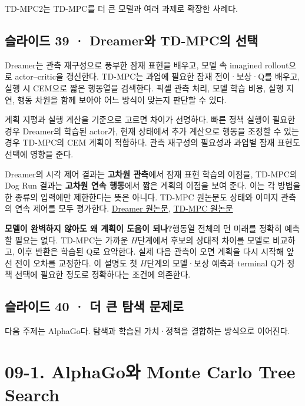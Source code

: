 \documentclass[11pt,a4paper]{article}
\begin{document}
TD-MPC2는 TD-MPC를 더 큰 모델과 여러 과제로 확장한 사례다.\par

\subsection{슬라이드 39 · Dreamer와 TD-MPC의 선택}

Dreamer는 관측 재구성으로 풍부한 잠재 표현을 배우고, 모델 속 imagined rollout으로 actor–critic을 갱신한다. TD-MPC는 과업에 필요한 잠재 전이·보상·Q를 배우고, 실행 시 CEM으로 짧은 행동열을 검색한다. 픽셀 관측 처리, 모델 학습 비용, 실행 지연, 행동 차원을 함께 보아야 어느 방식이 맞는지 판단할 수 있다.\par

계획 지평과 실행 계산을 기준으로 고르면 차이가 선명하다. 빠른 정책 실행이 필요한 경우 Dreamer의 학습된 actor가, 현재 상태에서 추가 계산으로 행동을 조정할 수 있는 경우 TD-MPC의 CEM 계획이 적합하다. 관측 재구성의 필요성과 과업별 잠재 표현도 선택에 영향을 준다.\par

Dreamer의 시각 제어 결과는 \textbf{고차원 관측}에서 잠재 표현 학습의 이점을, TD-MPC의 Dog Run 결과는 \textbf{고차원 연속 행동}에서 짧은 계획의 이점을 보여 준다. 이는 각 방법을 한 종류의 입력에만 제한한다는 뜻은 아니다. TD-MPC 원논문도 상태와 이미지 관측의 연속 제어를 모두 평가한다. \href{https://arxiv.org/abs/1912.01603}{Dreamer 원논문}, \href{https://proceedings.mlr.press/v162/hansen22a.html}{TD-MPC 원논문}\par

\par\medskip\noindent\textbf{모델이 완벽하지 않아도 왜 계획이 도움이 되나?}\quad 행동열 전체의 먼 미래를 정확히 예측할 필요는 없다. TD-MPC는 가까운 $H$단계에서 후보의 상대적 차이를 모델로 비교하고, 이후 반환은 학습된 Q로 요약한다. 실제 다음 관측이 오면 계획을 다시 시작해 앞선 전이 오차를 교정한다. 이 설명도 첫 $H$단계의 모델·보상 예측과 terminal Q가 정책 선택에 필요한 정도로 정확하다는 조건에 의존한다.\par

\subsection{슬라이드 40 · 더 큰 탐색 문제로}

다음 주제는 AlphaGo다. 탐색과 학습된 가치·정책을 결합하는 방식으로 이어진다.\par

\clearpage
\section{09-1. AlphaGo와 Monte Carlo Tree Search}
\end{document}
